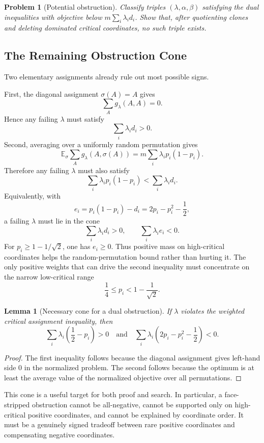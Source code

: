 \documentclass[11pt]{article}
\newtheorem{problem}{Problem}
\newtheorem{lemma}{Lemma}
\begin{document}
\begin{problem}[Potential obstruction]
Classify triples $(\lambda,\alpha,\beta)$ satisfying the dual inequalities
with objective below $m\sum_i\lambda_i d_i$.  Show that, after quotienting
clones and deleting dominated critical coordinates, no such triple exists.
\end{problem}

\subsection{The Remaining Obstruction Cone}

Two elementary assignments already rule out most possible signs.

First, the diagonal assignment $\sigma(A)=A$ gives
\[
  \sum_A g_\lambda(A,A)=0.
\]
Hence any failing $\lambda$ must satisfy
\[
  \sum_i\lambda_i d_i>0.
\]
Second, averaging over a uniformly random permutation gives
\[
  \mathbb{E}_\sigma
  \sum_A g_\lambda(A,\sigma(A))
  =
  m\sum_i\lambda_i p_i(1-p_i).
\]
Therefore any failing $\lambda$ must also satisfy
\[
  \sum_i\lambda_i p_i(1-p_i)
  <
  \sum_i\lambda_i d_i.
\]
Equivalently, with
\[
  e_i=p_i(1-p_i)-d_i
      =2p_i-p_i^2-\frac12,
\]
a failing $\lambda$ must lie in the cone
\[
  \sum_i\lambda_i d_i>0,
  \qquad
  \sum_i\lambda_i e_i<0.
\]
For $p_i\geq 1-1/\sqrt{2}$, one has $e_i\geq0$.  Thus positive mass on
high-critical coordinates helps the random-permutation bound rather than
hurting it.  The only positive weights that can drive the second inequality
must concentrate on the narrow low-critical range
\[
  \frac14\leq p_i<1-\frac1{\sqrt{2}}.
\]

\begin{lemma}[Necessary cone for a dual obstruction]
If $\lambda$ violates the weighted critical assignment inequality, then
\[
  \sum_i\lambda_i\left(\frac12-p_i\right)>0
  \quad\text{and}\quad
  \sum_i\lambda_i\left(2p_i-p_i^2-\frac12\right)<0.
\]
\end{lemma}

\begin{proof}
The first inequality follows because the diagonal assignment gives left-hand
side $0$ in the normalized problem.  The second follows because the optimum is
at least the average value of the normalized objective over all permutations.
\end{proof}

This cone is a useful target for both proof and search.  In particular, a
face-stripped obstruction cannot be all-negative, cannot be supported only on
high-critical positive coordinates, and cannot be explained by coordinate
order.  It must be a genuinely signed tradeoff between rare positive
coordinates and compensating negative coordinates.
\end{document}
